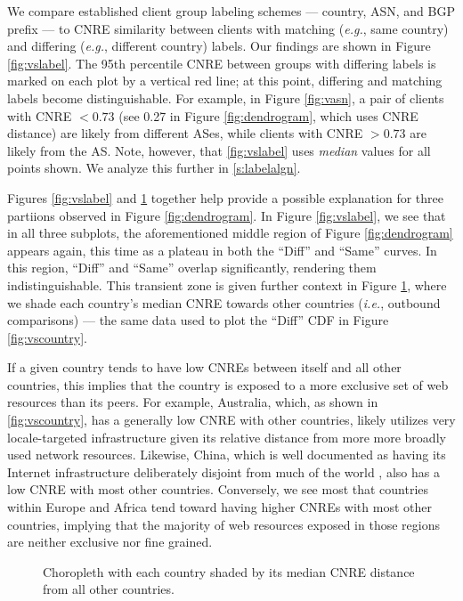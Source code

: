 We compare established client group labeling schemes  ---
country, ASN, and BGP prefix --- to CNRE similarity between clients with
matching (\emph{e.g.}, same country) and differing (\emph{e.g.}, different
country) labels. Our findings are shown in Figure \ref{fig:vslabel}. The 95th percentile CNRE between groups with differing labels
is marked on each plot by a vertical red line; at this point,
differing and matching labels become distinguishable. For example, in Figure
\ref{fig:vasn}, a pair of clients with CNRE $< 0.73$ (see 0.27 in
Figure \ref{fig:dendrogram}, which uses CNRE distance) are likely from different
ASes, while clients with CNRE $> 0.73$ are likely from the AS. Note, however, that
\ref{fig:vslabel} uses \emph{median} values for all points shown. We analyze
this further in \ref{s:labelalgn}. 


Figures \ref{fig:vslabel} and \ref{fig:cnredist} together help provide a possible
explanation for three partiions observed in Figure \ref{fig:dendrogram}. In
Figure \ref{fig:vslabel}, we see that in all three subplots, the aforementioned
middle region of Figure \ref{fig:dendrogram} appears again, this time as a
plateau in both the ``Diff'' and ``Same'' curves. In this region, ``Diff'' and
``Same'' overlap significantly, rendering them indistinguishable. This transient
zone is given further context in Figure \ref{fig:cnredist}, where we shade each
country's median CNRE towards other countries (\emph{i.e.}, outbound
comparisons) --- the same data used to plot the
``Diff'' CDF in Figure \ref{fig:vscountry}. 

If a given country tends to have low CNREs between itself and all other
countries, this implies that the country is exposed to a more exclusive set of
web resources than its peers. For example, Australia, which, as shown in
\ref{fig:vscountry}, has a generally low CNRE with other countries, likely
utilizes very locale-targeted infrastructure given its relative distance from
more more broadly used network resources. Likewise, China, which is well
documented as having its Internet infrastructure deliberately disjoint from much
of the world \cite{Anderson:2012}, also has a low CNRE with most other
countries. Conversely, we see most that countries within Europe and Africa tend
toward having higher CNREs with most other countries, implying that the majority
of web resources exposed in those regions are neither exclusive nor fine grained. 

\begin{figure}


    \caption{Choropleth with each country shaded by its median CNRE distance
    from all other countries.}
    \label{fig:cnredist}

\end{figure}


